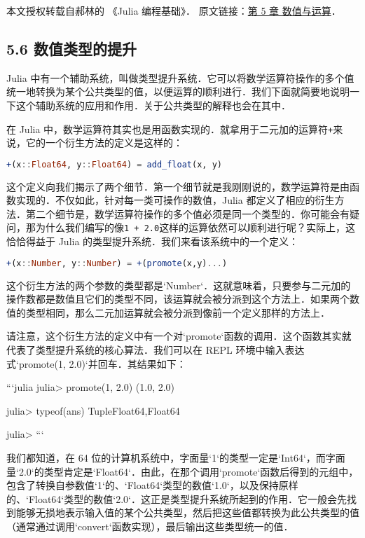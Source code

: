
本文授权转载自郝林的 《Julia 编程基础》． 原文链接：\href{https://github.com/hyper0x/JuliaBasics/blob/master/book/ch05.md}{第 5 章 数值与运算}．


\subsection{5.6 数值类型的提升}

Julia 中有一个辅助系统，叫做类型提升系统．它可以将数学运算符操作的多个值统一地转换为某个公共类型的值，以便运算的顺利进行．我们下面就简要地说明一下这个辅助系统的应用和作用．关于公共类型的解释也会在其中．

在 Julia 中，数学运算符其实也是用函数实现的．就拿用于二元加的运算符\verb|+|来说，它的一个衍生方法的定义是这样的：
\begin{lstlisting}[language=julia]
+(x::Float64, y::Float64) = add_float(x, y)
\end{lstlisting}

这个定义向我们揭示了两个细节．第一个细节就是我刚刚说的，数学运算符是由函数实现的．不仅如此，针对每一类可操作的数值，Julia 都定义了相应的衍生方法．第二个细节是，数学运算符操作的多个值必须是同一个类型的．你可能会有疑问，那为什么我们编写的像\verb|1 + 2.0|这样的运算依然可以顺利进行呢？实际上，这恰恰得益于 Julia 的类型提升系统．我们来看该系统中的一个定义：
\begin{lstlisting}[language=julia]
+(x::Number, y::Number) = +(promote(x,y)...)
\end{lstlisting}

这个衍生方法的两个参数的类型都是`Number`．这就意味着，只要参与二元加的操作数都是数值且它们的类型不同，该运算就会被分派到这个方法上．如果两个数值的类型相同，那么二元加运算就会被分派到像前一个定义那样的方法上．

请注意，这个衍生方法的定义中有一个对`promote`函数的调用．这个函数其实就代表了类型提升系统的核心算法．我们可以在 REPL 环境中输入表达式`promote(1, 2.0)`并回车．其结果如下：

```julia
julia> promote(1, 2.0)
(1.0, 2.0)

julia> typeof(ans)
Tuple{Float64,Float64}

julia> 
```

我们都知道，在 64 位的计算机系统中，字面量`1`的类型一定是`Int64`，而字面量`2.0`的类型肯定是`Float64`．由此，在那个调用`promote`函数后得到的元组中，包含了转换自参数值`1`的、`Float64`类型的数值`1.0`，以及保持原样的、`Float64`类型的数值`2.0`．这正是类型提升系统所起到的作用．它一般会先找到能够无损地表示输入值的某个公共类型，然后把这些值都转换为此公共类型的值（通常通过调用`convert`函数实现），最后输出这些类型统一的值．


